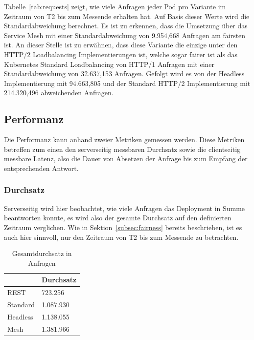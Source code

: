 Tabelle~\ref{tab:requests} zeigt, wie viele Anfragen jeder Pod pro Variante im Zeitraum von T2 bis zum Messende erhalten hat.
Auf Basis dieser Werte wird die Standardabweichung berechnet.
Es ist zu erkennen, dass die Umsetzung über das Service Mesh mit einer Standardabweichung von 9.954,668 Anfragen am fairsten ist.
An dieser Stelle ist zu erwähnen, dass diese Variante die einzige unter den HTTP/2 Loadbalancing Implementierungen ist, welche sogar fairer ist als das Kubernetes Standard Loadbalancing von HTTP/1 Anfragen mit einer Standardabweichung von 32.637,153 Anfragen.
Gefolgt wird es von der Headless Implementierung mit 94.663,805 und der Standard HTTP/2 Implementierung mit 214.320,496 abweichenden Anfragen.

\subsection{Performanz}\label{subsec:performance}

Die Performanz kann anhand zweier Metriken gemessen werden.
Diese Metriken betreffen zum einen den serverseitig messbaren Durchsatz sowie die clientseitig messbare Latenz, also die Dauer von Absetzen der Anfrage bis zum Empfang der entsprechenden Antwort.

\subsubsection{Durchsatz}

Serverseitig wird hier beobachtet, wie viele Anfragen das Deployment in Summe beantworten konnte, es wird also der gesamte Durchsatz auf den definierten Zeitraum verglichen.
Wie in Sektion~\ref{subsec:fairness} bereits beschrieben, ist es auch hier sinnvoll, nur den Zeitraum von T2 bis zum Messende zu betrachten.

\begin{table}[H]
    \centering
    \begin{tabular}{|l|l|}
        \hline
        & Durchsatz \\ \hline
        REST     & 723.256    \\ \hline
        Standard & 1.087.930   \\ \hline
        Headless & 1.138.055   \\ \hline
        Mesh     & 1.381.966   \\ \hline
    \end{tabular}
    \caption{Gesamtdurchsatz in Anfragen}
    \label{tab:durchsatz}
\end{table}

